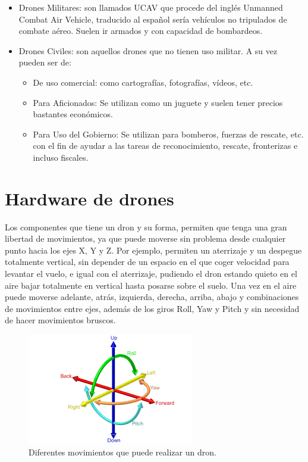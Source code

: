 \begin{itemize}
\item Drones Militares: son llamados UCAV que procede del inglés Unmanned Combat Air Vehicle, traducido al español sería vehículos no tripulados de combate aéreo. Suelen ir armados y con capacidad de bombardeos.
\item Drones Civiles: son aquellos drones que no tienen uso militar. A su vez pueden ser de: \begin{itemize}
\item De uso comercial: como cartografías, fotografías, vídeos, etc.
\item Para Aficionados: Se utilizan como un juguete y suelen tener precios bastantes económicos.
\item Para Uso del Gobierno: Se utilizan para bomberos, fuerzas de rescate, etc. con el fin de ayudar a las tareas de reconocimiento, rescate, fronterizas e incluso fiscales.
\end{itemize}
\end{itemize}

\section{Hardware de drones}

Los componentes que tiene un dron y su forma, permiten que tenga una gran libertad de movimientos, ya que puede moverse sin problema desde cualquier punto hacia los ejes X, Y y Z. Por ejemplo, permiten un aterrizaje y un despegue totalmente vertical, sin depender de un espacio en el que coger velocidad para levantar el vuelo, e igual con el aterrizaje, pudiendo el dron estando quieto en el aire bajar totalmente en vertical hasta posarse sobre el suelo. Una vez en el aire puede moverse adelante, atrás, izquierda, derecha, arriba, abajo y combinaciones de movimientos entre ejes, además de los giros Roll, Yaw y Pitch y sin necesidad de hacer movimientos bruscos.

\begin{figure}[H]
  \centering
  \includegraphics[scale=0.8]{imagenes/pitchRolYaw.png}
  \caption{Diferentes movimientos que puede realizar un dron.}
  \label{fig:gnat}
\end{figure}

